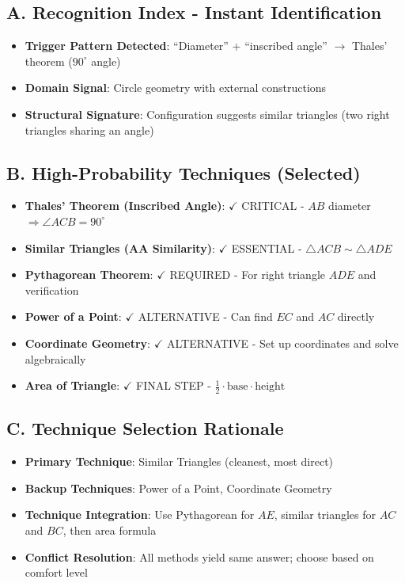 \documentclass[]{article}
\begin{document}
\begin{techniquesbox}
\subsection*{A. Recognition Index - Instant Identification}
\begin{itemize}[leftmargin=*]
    \item \textbf{Trigger Pattern Detected}: ``Diameter'' + ``inscribed angle'' $\rightarrow$ Thales' theorem ($90^\circ$ angle)
    \item \textbf{Domain Signal}: Circle geometry with external constructions
    \item \textbf{Structural Signature}: Configuration suggests similar triangles (two right triangles sharing an angle)
\end{itemize}

\subsection*{B. High-Probability Techniques (Selected)}
\begin{itemize}[leftmargin=*]
    \item \textbf{Thales' Theorem (Inscribed Angle)}: $\checkmark$ CRITICAL - $AB$ diameter $\Rightarrow \angle ACB = 90^\circ$
    \item \textbf{Similar Triangles (AA Similarity)}: $\checkmark$ ESSENTIAL - $\triangle ACB \sim \triangle ADE$
    \item \textbf{Pythagorean Theorem}: $\checkmark$ REQUIRED - For right triangle $ADE$ and verification
    \item \textbf{Power of a Point}: $\checkmark$ ALTERNATIVE - Can find $EC$ and $AC$ directly
    \item \textbf{Coordinate Geometry}: $\checkmark$ ALTERNATIVE - Set up coordinates and solve algebraically
    \item \textbf{Area of Triangle}: $\checkmark$ FINAL STEP - $\frac{1}{2} \cdot \text{base} \cdot \text{height}$
\end{itemize}

\subsection*{C. Technique Selection Rationale}
\begin{itemize}[leftmargin=*]
    \item \textbf{Primary Technique}: Similar Triangles (cleanest, most direct)
    \item \textbf{Backup Techniques}: Power of a Point, Coordinate Geometry
    \item \textbf{Technique Integration}: Use Pythagorean for $AE$, similar triangles for $AC$ and $BC$, then area formula
    \item \textbf{Conflict Resolution}: All methods yield same answer; choose based on comfort level
\end{itemize}


\end{techniquesbox}
\end{document}
